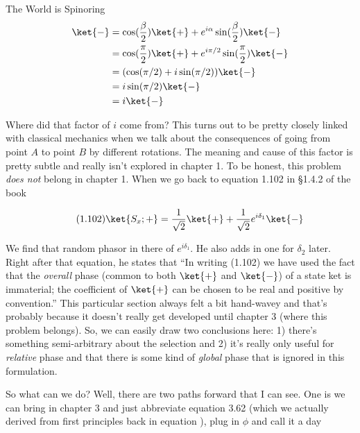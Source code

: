 \begin{answer}
\begin{answerpart}{The World is Spinoring}
    \begin{equation}
      \begin{split}
        \ket{-}
        &= \cos(\frac{\beta}{2})\ket{+}
        +  e^{i\alpha}\sin(\frac{\beta}{2})\ket{-}
        \\
        &= \cos(\frac{\pi}{2})\ket{+}
        +  e^{i\pi/2}\sin(\frac{\pi}{2})\ket{-}
        \\
        &= (\cos(\pi/2) + i\sin(\pi/2))\ket{-}
        \\
        &= i\sin(\pi/2)\ket{-}
        \\
        &= i\ket{-}
        \\
      \end{split}
    \end{equation}

    Where did that factor of $i$ come from?  This turns out to be
    pretty closely linked with classical mechanics when we talk about
    the consequences of going from point $A$ to point $B$ by different
    rotations.  The meaning and cause of this factor is pretty subtle
    and really isn't explored in chapter 1.  To be honest, this
    problem \emph{does not} belong in chapter 1.  When we go back to
    equation 1.102 in \S 1.4.2 of the book

    \begin{equation}
      \tag{1.102} \ket{S_x;+} = \frac{1}{\sqrt{2}}\ket{+} +
      \frac{1}{\sqrt{2}}e^{i\delta_1}\ket{-}
    \end{equation}

    We find that random phasor in there of $e^{i\delta_1}$.  He also
    adds in one for $\delta_2$ later.  Right after that equation, he
    states that ``In writing (1.102) we have used the fact that the
    \emph{overall} phase (common to both $\ket{+}$ and $\ket{-}$) of a
    state ket is immaterial; the coefficient of $\ket{+}$ can be
    chosen to be real and positive by convention.''  This particular
    section always felt a bit hand-wavey and that's probably because
    it doesn't really get developed until chapter 3 (where this
    problem belongs).  So, we can easily draw two conclusions here: 1)
    there's something semi-arbitrary about the selection and 2) it's
    really only useful for \emph{relative} phase and that there is
    some kind of \emph{global} phase that is ignored in this
    formulation.

    So what can we do?  Well, there are two paths forward that I can
    see.  One is we can bring in chapter 3 and just abbreviate
    equation 3.62 (which we actually derived from first principles
    back in equation ), plug in $\phi$ and call
    it a day


\end{answerpart}
\end{answer}
